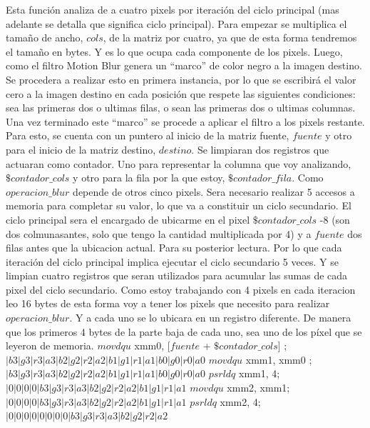 \documentclass[a4paper]{article}
\begin{document}
Esta función analiza de a cuatro pixels por iteración del ciclo principal (mas adelante se detalla que significa ciclo principal). Para empezar se multiplica el tamaño de ancho, $cols$, de la matriz por cuatro, ya que de esta forma tendremos el tamaño en bytes. Y es lo que ocupa cada componente de los pixels. Luego, como el filtro Motion Blur genera un “marco” de color negro a la imagen destino. Se procedera a realizar esto en primera instancia, por lo que se escribirá el valor cero a la imagen destino en cada posición que respete las siguientes condiciones: sea las primeras dos o ultimas filas, o sean las primeras dos o ultimas columnas. Una vez terminado este “marco” se procede a aplicar el filtro a los pixels restante. Para esto, se cuenta con un puntero al inicio de la matriz fuente, $fuente$ y otro para el inicio de la matriz destino, $destino$. Se limpiaran dos registros que actuaran como contador. Uno para  representar la columna que voy analizando, $\$contador\_cols$ y otro para la fila por la que estoy, $\$contador\_fila$. 
  Como $operacion\_blur$ depende de otros cinco pixels. Sera necesario realizar 5 accesos a memoria para completar su valor, lo que va a constituir un ciclo secundario. El ciclo principal sera el encargado de ubicarme en el pixel $\$contador\_cols$ -8 (son dos colmunasantes, solo que tengo la cantidad multiplicada por 4) y a $fuente$ dos filas antes que la ubicacion actual.	Para su posterior lectura. Por lo que cada iteración del ciclo principal implica ejecutar el ciclo secundario 5 veces. Y se limpian cuatro registros que seran utilizados para acumular las sumas de cada pixel del ciclo secundario.
Como estoy trabajando con 4 pixels en cada iteracion leo 16 bytes de esta forma voy a tener los pixels que necesito para realizar $operacion\_blur$.
Y a cada uno se lo ubicara en un registro diferente. De manera que los primeros 4 bytes de la parte baja de cada uno, sea uno de los píxel que se leyeron de memoria. \newline 
$movdqu$ xmm0, $[fuente$ + $\$contador\_cols]$ ;$|b3|g3|r3|a3|b2|g2|r2|a2|b1|g1|r1|a1|b0|g0|r0|a0$ \newline
$movdqu$ xmm1, xmm0 ;$|b3|g3|r3|a3|b2|g2|r2|a2|b1|g1|r1|a1|b0|g0|r0|a0$ \newline
$psrldq$ xmm1, 4; 	    $|0|0|0|0|b3|g3|r3|a3|b2|g2|r2|a2|b1|g1|r1|a1$ \newline
$movdqu$ xmm2, xmm1;     $|0|0|0|0|b3|g3|r3|a3|b2|g2|r2|a2|b1|g1|r1|a1$ \newline
$psrldq$ xmm2, 4;  		$|0|0|0|0|0|0|0|0|b3|g3|r3|a3|b2|g2|r2|a2$ \newline
\end{document}
